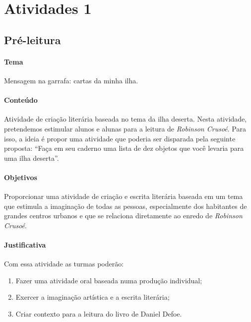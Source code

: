 \documentclass[12pt]{extarticle}
\begin{document}

\pagebreak\section{Atividades 1}

%

\subsection{Pré-leitura}


\paragraph{Tema} Mensagem na garrafa: cartas da minha ilha.

\paragraph{Conteúdo}
Atividade de criação literária baseada no tema da ilha deserta.
Nesta atividade, pretendemos estimular alunos e alunas para a leitura de
\emph{Robinson Crusoé}. Para isso, a ideia é propor uma atividade que
poderia ser disparada pela seguinte proposta: ``Faça em seu caderno uma
lista de dez objetos que você levaria para uma ilha deserta''.


\paragraph{Objetivos}
Proporcionar uma atividade de criação e escrita literária baseada em um
tema que estimula a imaginação de todas as pessoas, especialmente dos
habitantes de grandes centros urbanos e que se relaciona diretamente ao
enredo de \emph{Robinson Crusoé}.

\paragraph{Justificativa}
Com essa atividade as turmas poderão:

\begin{enumerate}
\item
Fazer uma atividade oral baseada numa produção individual; 

\item
Exercer a imaginação artística e a escrita literária;

\item
Criar contexto para a leitura do livro de Daniel Defoe.
\end{enumerate}
\end{document}
